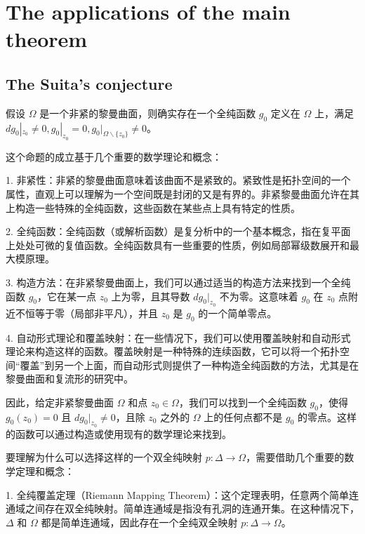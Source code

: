
\section{The applications of the main theorem}
\subsection{The Suita's conjecture}

\begin{remark}
假设 \(\Omega\) 是一个非紧的黎曼曲面，则确实存在一个全纯函数 \(g_0\) 定义在 \(\Omega\) 上，满足 \(d g_0|_{z_0} \neq 0, g_0|_{z_0} = 0, g_0|_{\Omega \backslash \{z_0\}} \neq 0\)。

这个命题的成立基于几个重要的数学理论和概念：

1. 非紧性：非紧的黎曼曲面意味着该曲面不是紧致的。紧致性是拓扑空间的一个属性，直观上可以理解为一个空间既是封闭的又是有界的。非紧黎曼曲面允许在其上构造一些特殊的全纯函数，这些函数在某些点上具有特定的性质。

2. 全纯函数：全纯函数（或解析函数）是复分析中的一个基本概念，指在复平面上处处可微的复值函数。全纯函数具有一些重要的性质，例如局部幂级数展开和最大模原理。

3. 构造方法：在非紧黎曼曲面上，我们可以通过适当的构造方法来找到一个全纯函数 \(g_0\)，它在某一点 \(z_0\) 上为零，且其导数 \(d g_0|_{z_0}\) 不为零。这意味着 \(g_0\) 在 \(z_0\) 点附近不恒等于零（局部非平凡），并且 \(z_0\) 是 \(g_0\) 的一个简单零点。

4. 自动形式理论和覆盖映射：在一些情况下，我们可以使用覆盖映射和自动形式理论来构造这样的函数。覆盖映射是一种特殊的连续函数，它可以将一个拓扑空间“覆盖”到另一个上面，而自动形式则提供了一种构造全纯函数的方法，尤其是在黎曼曲面和复流形的研究中。

因此，给定非紧黎曼曲面 \(\Omega\) 和点 \(z_0 \in \Omega\)，我们可以找到一个全纯函数 \(g_0\)，使得 \(g_0(z_0) = 0\) 且 \(d g_0|_{z_0} \neq 0\)，且除 \(z_0\) 之外的 \(\Omega\) 上的任何点都不是 \(g_0\) 的零点。这样的函数可以通过构造或使用现有的数学理论来找到。
\end{remark}

要理解为什么可以选择这样的一个双全纯映射 \( p: \Delta \to \Omega \)，需要借助几个重要的数学定理和概念：

1. 全纯覆盖定理（Riemann Mapping Theorem）：这个定理表明，任意两个简单连通域之间存在双全纯映射。简单连通域是指没有孔洞的连通开集。在这种情况下，\( \Delta \) 和 \( \Omega \) 都是简单连通域，因此存在一个全纯双全映射 \( p: \Delta \to \Omega \)。

